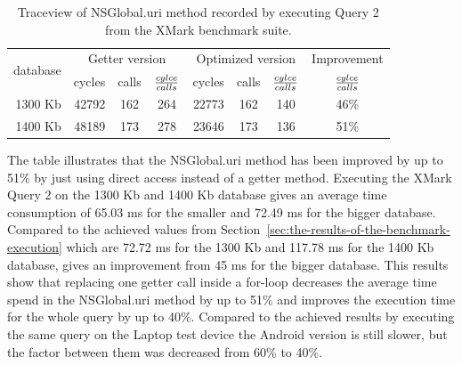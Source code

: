 \begin {table}[htpb] 
  \begin{center}
\begin {tabular} {|r|r|c|c|r|c|c||c|}
  	\hline
	\multirow{2}{*}{database}&\multicolumn{3}{c}{Getter version}&\multicolumn{3}{|c||}{Optimized version}&Improvement\\
	\cline{2-8}
	&cycles&calls&${cylce \over calls}$&cycles&calls&${cylce \over calls}$&${cylce \over calls}$\\
	\hline
	\hline
	1300 Kb&42792&162&264&22773&162&140&46\%\\
	\hline
	1400 Kb&48189&173&278&23646&173&136&51\%\\
	\hline
\end {tabular}
\caption {Traceview of \textsf{NSGlobal.uri} method recorded by executing Query 2 from the XMark benchmark suite.}
\label {tab:traceview-q2-optimized}
\end{center}
\end {table}
The table illustrates that the \textsf{NSGlobal.uri} method has been improved by up to 51\% by just using direct access instead of a getter method.
Executing the XMark Query 2 on the 1300 Kb and 1400 Kb database gives an average time consumption of 65.03 ms for the smaller and 72.49 ms for the bigger database.
Compared to the achieved values from Section~\ref{sec:the-results-of-the-benchmark-execution} which are 72.72 ms for the 1300 Kb and 117.78 ms for the 1400 Kb database, gives an improvement from 45 ms for the bigger database.
This results show that replacing one getter call inside a for-loop decreases the average time spend in the \textsf{NSGlobal.uri} method by up to 51\% and improves the execution time  for the whole query by up to 40\%.
Compared to the achieved results by executing the same query on the Laptop test device the Android version is still slower, but the factor between them was decreased from 60\% to 40\%.\\

